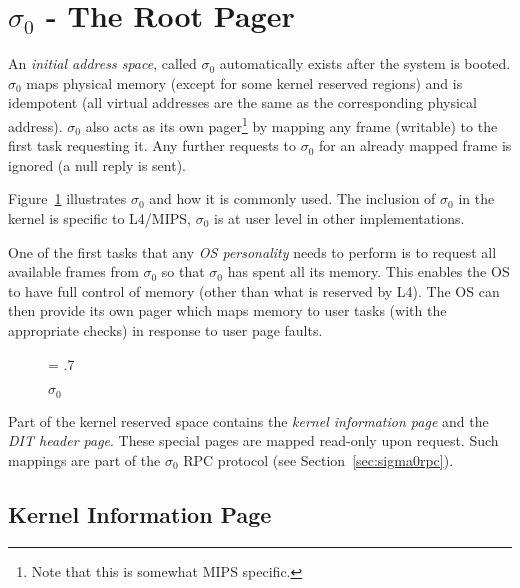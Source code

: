 \section{$\sigma_0$ - The Root Pager}


\label{sec:sigma0}

An \emph{initial address space}, called $\sigma_0$ automatically
exists after the system is booted. $\sigma_0$ maps physical memory
(except for some kernel reserved regions) and is idempotent (all
virtual addresses are the same as the corresponding physical address).
$\sigma_0$ also acts as its own pager\footnote{Note that this is
  somewhat MIPS specific.} by mapping any frame (writable) to the
first task requesting it. Any further requests to $\sigma_0$ for an
already mapped frame is ignored (a null reply is sent).

Figure~\ref{fig:sigma0} illustrates $\sigma_0$ and how it is commonly
used. The inclusion of \(\sigma_0\) in the kernel is specific to
L4/MIPS, \(\sigma_0\) is at user level in other implementations.

One of the first tasks that any \emph{OS personality} needs to perform
is to request all available frames from $\sigma_0$ so that $\sigma_0$
has spent all its memory. This enables the OS to have full control of
memory (other than what is reserved by L4). The OS can then provide
its own pager which maps memory to user tasks (with the appropriate
checks) in response to user page faults.

\begin{figure}[h]
\begin{center}
\leavevmode
\epsfxsize = .7\textwidth
{}
\end{center}
\caption{$\sigma_0$}
\label{fig:sigma0}
\end{figure}

Part of the kernel reserved space contains the \emph{kernel
  information page} and the \emph{DIT header page}. These special
pages are mapped read-only upon request. Such mappings are part of the
$\sigma_0$ RPC protocol (see Section~\ref{sec:sigma0rpc}).



\subsection{Kernel Information Page}

